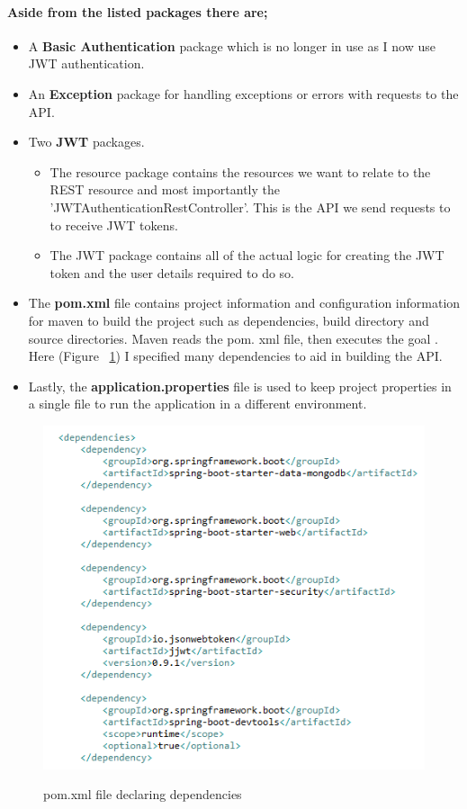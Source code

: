 \paragraph{Aside from the listed packages there are;}
\begin{itemize}
    \item A \textbf{Basic Authentication} package which is no longer in use as I now use JWT authentication.
    \item An \textbf{Exception} package for handling exceptions or errors with requests to the API.
    \item Two \textbf{JWT} packages.
        \begin{itemize}
            \item The resource package contains the resources we want to relate to the REST resource and most importantly the 'JWTAuthenticationRestController'. This is the API we send requests to to receive JWT tokens.
            \item The JWT package contains all of the actual logic for creating the JWT token and the user details required to do so.
        \end{itemize}
        \item The \textbf{pom.xml} file contains project information and configuration information for maven to build the project such as dependencies, build directory and source directories. Maven reads the pom. xml file, then executes the goal \cite{POM}. Here (Figure ~\ref{pom_label}) I specified many dependencies to aid in building the API.
        \item Lastly, the \textbf{application.properties} file is used to keep project properties in a single file to run the application in a different environment.
\end{itemize}
\begin{figure}[ht]
    \centering
    \includegraphics[scale=0.6]{Images/pom.png} 
    \label{pom_label}
    \caption{pom.xml file declaring dependencies}
\end{figure}

